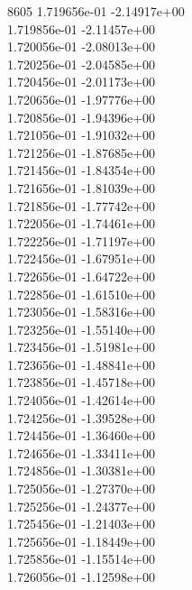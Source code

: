 8605	1.719656e-01	-2.14917e+00	\\ 	1.719856e-01	-2.11457e+00	\\ 	1.720056e-01	-2.08013e+00	\\ 	1.720256e-01	-2.04585e+00	\\ 	1.720456e-01	-2.01173e+00	\\ 	1.720656e-01	-1.97776e+00	\\ 	1.720856e-01	-1.94396e+00	\\ 	1.721056e-01	-1.91032e+00	\\ 	1.721256e-01	-1.87685e+00	\\ 	1.721456e-01	-1.84354e+00	\\ 	1.721656e-01	-1.81039e+00	\\ 	1.721856e-01	-1.77742e+00	\\ 	1.722056e-01	-1.74461e+00	\\ 	1.722256e-01	-1.71197e+00	\\ 	1.722456e-01	-1.67951e+00	\\ 	1.722656e-01	-1.64722e+00	\\ 	1.722856e-01	-1.61510e+00	\\ 	1.723056e-01	-1.58316e+00	\\ 	1.723256e-01	-1.55140e+00	\\ 	1.723456e-01	-1.51981e+00	\\ 	1.723656e-01	-1.48841e+00	\\ 	1.723856e-01	-1.45718e+00	\\ 	1.724056e-01	-1.42614e+00	\\ 	1.724256e-01	-1.39528e+00	\\ 	1.724456e-01	-1.36460e+00	\\ 	1.724656e-01	-1.33411e+00	\\ 	1.724856e-01	-1.30381e+00	\\ 	1.725056e-01	-1.27370e+00	\\ 	1.725256e-01	-1.24377e+00	\\ 	1.725456e-01	-1.21403e+00	\\ 	1.725656e-01	-1.18449e+00	\\ 	1.725856e-01	-1.15514e+00	\\ 	1.726056e-01	-1.12598e+00	\\ \hline
